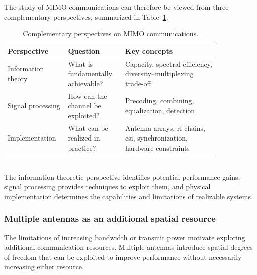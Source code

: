 \vspace{10pt}
The study of MIMO communications can therefore be viewed from
three complementary perspectives, summarized in
Table~\ref{tab:mimo_perspectives}.
\begin{table}[ht]
	\centering
	\caption{Complementary perspectives on MIMO communications.}
	\label{tab:mimo_perspectives}
	\begin{tabular}{%
			p{0.20\linewidth}
			p{0.24\linewidth}
			p{0.40\linewidth}}
		\toprule
		\textbf{Perspective} &
		\textbf{Question} &
		\textbf{Key concepts} \\
		\midrule
		Information theory &
		What is fundamentally achievable? &
		Capacity, spectral efficiency,
		diversity--multiplexing trade-off \\
		\addlinespace
		Signal processing &
		How can the channel  be exploited? &
		Precoding, combining, equalization,
		detection \\
		\addlinespace
		Implementation &
		What can be realized in practice? &
		Antenna arrays, \ac{rf} chains, \ac{csi},
		synchronization, hardware constraints \\
		\bottomrule
	\end{tabular}
\end{table}
\\
The information-theoretic perspective identifies potential
performance gains, signal processing provides techniques to
exploit them, and physical implementation determines the
capabilities and limitations of realizable systems.


\subsubsection*{Multiple antennas as an additional spatial resource}

The limitations of increasing bandwidth or transmit power
motivate exploring additional communication resources.
Multiple antennas introduce spatial degrees of freedom that
can be exploited to improve performance without necessarily
increasing either resource.

